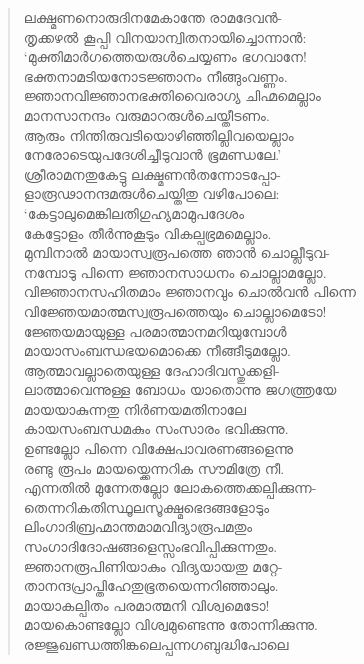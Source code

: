 \begin{verse}
ലക്ഷ്മണനൊരുദിനമേകാന്തേ രാമദേവന്‍-\\
തൃക്കഴല്‍ കൂപ്പി വിനയാന്വിതനായിച്ചൊന്നാന്‍:\\
‘മുക്തിമാര്‍ഗത്തെയരുള്‍ചെയ്യണം ഭഗവാനേ!\\
ഭക്തനാമടിയനോടജ്ഞാനം നീങ്ങുംവണ്ണം.\\
ജ്ഞാനവിജ്ഞാനഭക്തിവൈരാഗ്യ ചിഹ്മമെല്ലാം\\
മാനസാനന്ദം വരുമാറരുള്‍ചെയ്തീടണം.\\
ആരും നിന്തിരുവടിയൊഴിഞ്ഞില്ലിവയെല്ലാം\\
നേരോടെയുപദേശിച്ചീടുവാന്‍ ഭൂമണ്ഡലേ.’\\
ശ്രീരാമനതുകേട്ടു ലക്ഷ്മണന്‍തന്നോടപ്പോ-\\
ളാരൂഢാനന്ദമരുള്‍ചെയ്തിതു വഴിപോലെ:\\
‘കേട്ടാലുമെങ്കിലതിഗുഹ്യമാമുപദേശം\\
കേട്ടോളം തീര്‍ന്നുകൂടും വികല്പഭ്രമമെല്ലാം.\\
മുമ്പിനാല്‍ മായാസ്വരൂപത്തെ ഞാന്‍ ചൊല്ലീടുവ-\\
നമ്പോടു പിന്നെ ജ്ഞാനസാധനം ചൊല്ലാമല്ലോ.\\
വിജ്ഞാനസഹിതമാം ജ്ഞാനവും ചൊല്‍വന്‍ പിന്നെ\\
വിജ്ഞേയമാത്മസ്വരൂപത്തെയും ചൊല്ലാമെടോ!\\
ജ്ഞേയമായുള്ള പരമാത്മാനമറിയുമ്പോള്‍\\
മായാസംബന്ധഭയമൊക്കെ നീങ്ങീടുമല്ലോ.\\
ആത്മാവല്ലാതെയുള്ള ദേഹാദിവസ്തുക്കളി-\\
ലാത്മാവെന്നുള്ള ബോധം യാതൊന്നു ജഗത്ത്രയേ\\
മായയാകുന്നതു നിര്‍ണയമതിനാലേ\\
കായസംബന്ധമകും സംസാരം ഭവിക്കുന്നു.\\
ഉണ്ടല്ലോ പിന്നെ വിക്ഷേപാവരണങ്ങളെന്നു\\
രണ്ടു രൂപം മായയ്ക്കെന്നറിക സൗമിത്രേ നീ.\\
എന്നതില്‍ മുന്നേതല്ലോ ലോകത്തെക്കല്പിക്കുന്ന-\\
തെന്നറികതിസ്ഥൂലസൂക്ഷ്മഭെദങ്ങളോടും\\
ലിംഗാദിബ്രഹ്മാന്തമാമവിദ്യാരൂപമതും\\
സംഗാദിദോഷങ്ങളെസ്സംഭവിപ്പിക്കുന്നതും.\\
ജ്ഞാനരൂപിണിയാകും വിദ്യയായതു മറ്റേ-\\
താനന്ദപ്രാപ്തിഹേതുഭൂതയെന്നറിഞ്ഞാലും.\\
മായാകല്പിതം പരമാത്മനി വിശ്വമെടോ!\\
മായകൊണ്ടല്ലോ വിശ്വമുണ്ടെന്നു തോന്നിക്കുന്നു.\\
രജ്ജുഖണ്ഡത്തിങ്കലെപ്പന്നഗബുദ്ധിപോലെ\\

\end{verse}

